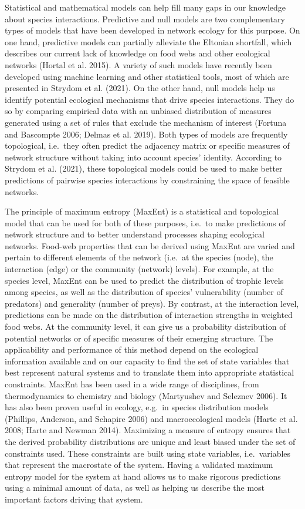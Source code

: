\documentclass[10pt,oneside]{article}
\begin{document}
Statistical and mathematical models can help fill many gaps in our
knowledge about species interactions. Predictive and null models are two
complementary types of models that have been developed in network
ecology for this purpose. On one hand, predictive models can partially
alleviate the Eltonian shortfall, which describes our current lack of
knowledge on food webs and other ecological networks (Hortal et al.
2015). A variety of such models have recently been developed using
machine learning and other statistical tools, most of which are
presented in Strydom et al. (2021). On the other hand, null models help
us identify potential ecological mechanisms that drive species
interactions. They do so by comparing empirical data with an unbiased
distribution of measures generated using a set of rules that exclude the
mechanism of interest (Fortuna and Bascompte 2006; Delmas et al. 2019).
Both types of models are frequently topological, i.e.~they often predict
the adjacency matrix or specific measures of network structure without
taking into account species' identity. According to Strydom et al.
(2021), these topological models could be used to make better
predictions of pairwise species interactions by constraining the space
of feasible networks.

The principle of maximum entropy (MaxEnt) is a statistical and
topological model that can be used for both of these purposes, i.e.~to
make predictions of network structure and to better understand processes
shaping ecological networks. Food-web properties that can be derived
using MaxEnt are varied and pertain to different elements of the network
(i.e.~at the species (node), the interaction (edge) or the community
(network) levels). For example, at the species level, MaxEnt can be used
to predict the distribution of trophic levels among species, as well as
the distribution of species' vulnerability (number of predators) and
generality (number of preys). By contrast, at the interaction level,
predictions can be made on the distribution of interaction strengths in
weighted food webs. At the community level, it can give us a probability
distribution of potential networks or of specific measures of their
emerging structure. The applicability and performance of this method
depend on the ecological information available and on our capacity to
find the set of state variables that best represent natural systems and
to translate them into appropriate statistical constraints. MaxEnt has
been used in a wide range of disciplines, from thermodynamics to
chemistry and biology (Martyushev and Seleznev 2006). It has also been
proven useful in ecology, e.g.~in species distribution models (Phillips,
Anderson, and Schapire 2006) and macroecological models (Harte et al.
2008; Harte and Newman 2014). Maximizing a measure of entropy ensures
that the derived probability distributions are unique and least biased
under the set of constraints used. These constraints are built using
state variables, i.e.~variables that represent the macrostate of the
system. Having a validated maximum entropy model for the system at hand
allows us to make rigorous predictions using a minimal amount of data,
as well as helping us describe the most important factors driving that
system.
\end{document}
